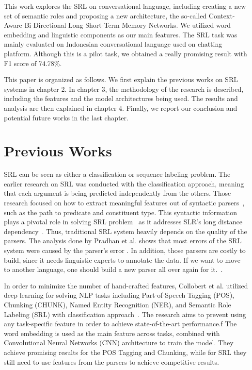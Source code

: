 This work explores the SRL on conversational language, including creating a new set of semantic roles and proposing a new architecture, the so-called Context-Aware Bi-Directional Long Short-Term Memory Networks. We utilized word embedding and linguistic components as our main features. The SRL task was mainly evaluated on Indonesian conversational language used on chatting platform. Although this is a pilot task, we obtained a really promising result with F1 score of 74.78\%.

This paper is organized as follows. We first explain the previous works on SRL systems in chapter 2. In chapter 3, the methodology of the research is described, including the features and the model architectures being used. The results and analysis are then explained in chapter 4. Finally, we report our conclusion and potential future works in the last chapter.

\section{Previous Works}
SRL can be seen as either a classification or sequence labeling problem. The earlier research on SRL was conducted with the classification approach, meaning that each argument is being predicted independently from the others. Those research focused on how to extract meaningful features out of syntactic parsers~\cite{gildea2002automatic, gildea2002necessity, pradhan2005semantic}, such as the path to predicate and constituent type. This syntactic information plays a pivotal role in solving SRL problem~\cite{punyakanok2008importance} as it addresses SLR’s long distance dependency~\cite{zhou2015end}. Thus, traditional SRL system heavily depends on the quality of the parsers. The analysis done by Pradhan et al. shows that most errors of the SRL system were caused by the parser's error \cite{pradhan2005semantic}. In addition, those parsers are costly to build, since it needs linguistic experts to annotate the data. If we want to move to another language, one should build a new parser all over again for it.~\cite{zhou2015end}.

In order to minimize the number of hand-crafted features, Collobert et al. utilized deep learning for solving NLP tasks including Part-of-Speech Tagging (POS), Chunking (CHUNK), Named Entity Recognition (NER), and Semantic Role Labeling (SRL) with classification approach~\cite{collobert2011natural}. The research aims to prevent using any task-specific feature in order to achieve state-of-the-art performance.f The word embedding is used as the main feature across tasks, combined with Convolutional Neural Networks (CNN) architecture to train the model. They achieve promising results for the POS Tagging and Chunking, while for SRL they still need to use features from the parsers to achieve competitive results.

